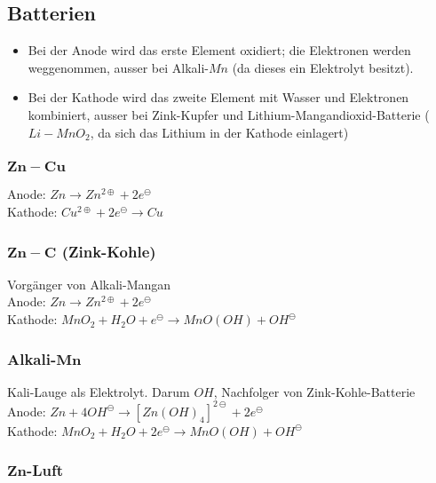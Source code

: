 \subsection{Batterien}

\begin{itemize}
	\item Bei der Anode wird das erste Element oxidiert; die Elektronen werden weggenommen, ausser bei Alkali-$Mn$ (da dieses ein Elektrolyt besitzt).
	\item Bei der Kathode wird das zweite Element mit Wasser und Elektronen kombiniert, ausser bei Zink-Kupfer und Lithium-Mangandioxid-Batterie ($Li-MnO_2$, da sich das Lithium in der Kathode einlagert)
\end{itemize}

\subsubsection{$\boldsymbol{Zn-Cu}$}

Anode: $Zn \rightarrow Zn^{2\oplus} + 2e^\ominus$\\

Kathode: $Cu^{2\oplus} + 2e^\ominus \rightarrow Cu$

\subsubsection{$\boldsymbol{Zn-C}$ (Zink-Kohle)}

Vorgänger von Alkali-Mangan\\

Anode: $Zn \rightarrow Zn^{2\oplus} + 2e^\ominus$\\

Kathode: $MnO_2 + H_2O + e^\ominus \rightarrow MnO(OH) + OH^\ominus$

\subsubsection{Alkali-$\boldsymbol{Mn}$}

Kali-Lauge als Elektrolyt. Darum $OH$, Nachfolger von Zink-Kohle-Batterie\\

Anode: $Zn + 4OH^\ominus \rightarrow [Zn(OH)_4]^{2\ominus} + 2e^\ominus$\\

Kathode: $MnO_2 + H_2O + 2e^\ominus \rightarrow MnO(OH) +OH^\ominus$

\subsubsection{$\boldsymbol{Zn}$-Luft}

